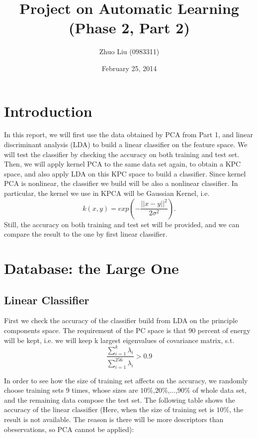 \documentclass{article}
\author{Zhuo Liu (0983311)}
\title{Project on Automatic Learning (Phase 2, Part 2)}
\date{February 25, 2014}
\begin{document}
\maketitle


\section{Introduction}

In this report, we will first use the data obtained by PCA from Part 1, and linear discriminant analysis (LDA) to build a linear classifier on the
feature space. We will test the classifier by checking the accuracy on both training and test set. Then, we will apply kernel PCA to the same data
set again, to obtain a KPC space, and also apply LDA on this KPC space to build a classifier. Since kernel PCA is nonlinear, the
classifier we build will be also a nonlinear classifier. In particular, the kernel we use in KPCA will be Gaussian Kernel, i.e.
\begin{equation}
 k(x,y) = exp(-\frac{||x-y||^{2}}{2\sigma^{2}}).
\end{equation}
Still, the accuracy on both training and test set will be provided, and we can compare the result to the one by first linear classifier.

\goodbreak

\section{Database: the Large One}

\subsection{Linear Classifier}

First we check the accuracy of the classifier build from LDA on the principle components space. The requirement of the PC space is that 
90 percent of energy will be kept, i.e. we will keep k largest eigenvalues of covariance matrix, s.t.
\begin{equation}
 \frac{\sum_{i=1}^{k}\lambda_{i}}{\sum_{i=1}^{256}\lambda_{i}} > 0.9
\end{equation}

In order to see how the size of training set affects on the accuracy, we randomly choose training sets 9 times, whose sizes are $10\%$,$20\%$,...,$90\%$ 
of whole data set, and the remaining data compose the test set. The following table shows the accuracy of the linear classifier (Here, when the size
of training set is $10\%$, the result is not available. The reason is there will be more descriptors than obeservations, so PCA cannot be applied):
\end{document}
